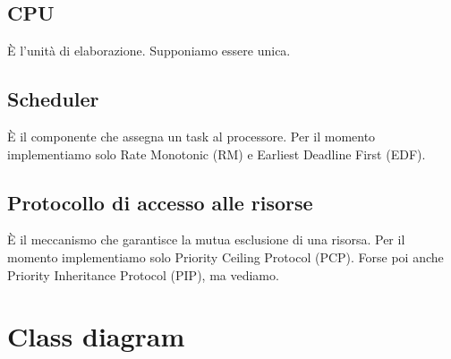 \subsection{CPU}
È l'unità di elaborazione. Supponiamo essere unica.

\subsection{Scheduler}
È il componente che assegna un task al processore. Per il momento implementiamo solo Rate Monotonic (RM) e Earliest Deadline First (EDF).

\subsection{Protocollo di accesso alle risorse}
È il meccanismo che garantisce la mutua esclusione di una risorsa. Per il momento implementiamo solo Priority Ceiling Protocol (PCP). Forse poi anche Priority Inheritance Protocol (PIP), ma vediamo.

\section{Class diagram}